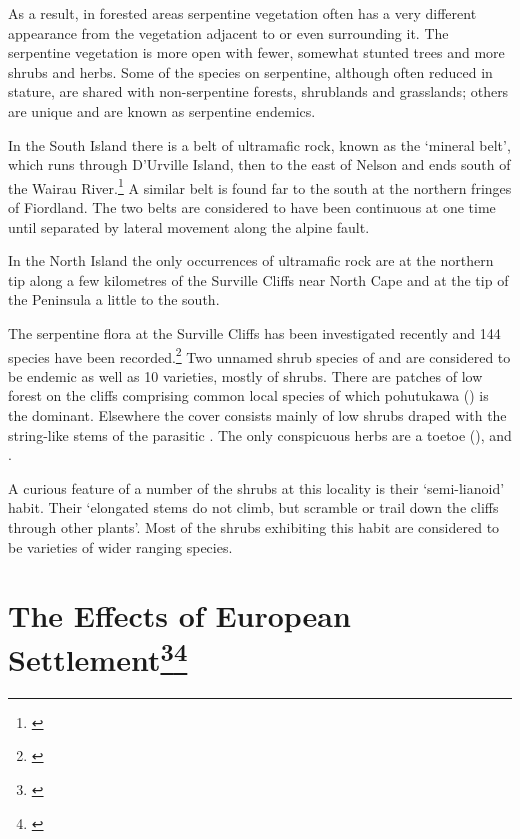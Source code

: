 As a result, in forested areas serpentine vegetation often has a very different appearance from the vegetation adjacent to or even surrounding it.
The serpentine vegetation is more open with fewer, somewhat stunted trees and more shrubs and herbs.
Some of the species on serpentine, although often reduced in stature, are shared with non-serpentine forests, shrublands and grasslands; others are unique and are known as serpentine endemics.

In the South Island there is a belt of ultramafic rock, known as the `mineral belt', which runs through D'Urville Island, then to the east of Nelson and ends south of the Wairau River.\footnote{\cite{betts1918notes}}
A similar belt is found far to the south at the northern fringes of Fiordland.
The two belts are considered to have been continuous at one time until separated by lateral movement along the alpine fault.

In the North Island the only occurrences of ultramafic rock are at the northern tip along a few kilometres of the Surville Cliffs near North Cape and at the tip of the Peninsula a little to the south.

The serpentine flora at the Surville Cliffs has been investigated recently and 144 species have been recorded.\footnote{\cite{druce1979indigenous}}
Two unnamed shrub species of  and  are considered to be endemic as well as 10 varieties, mostly of shrubs.
There are patches of low forest on the cliffs comprising common local species of which pohutukawa () is the dominant.
Elsewhere the cover consists mainly of low shrubs draped with the string-like stems of the parasitic .
The only conspicuous herbs are a toetoe (),  and .

A curious feature of a number of the shrubs at this locality is their `semi-lianoid' habit.
Their `elongated stems do not climb, but scramble or trail down the cliffs through other plants'.
Most of the shrubs exhibiting this habit are considered to be varieties of wider ranging species.

\section[The Effects of European Settlement]{The Effects of European Settlement\footnote{\cite{healy1980flora}}\footnote{\cite{healy1969adventive}}}

